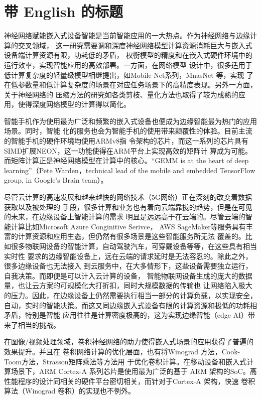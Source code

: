 
\chapter{带 English 的标题}
\label{cha:intro}

神经网络赋能嵌入式设备智能是当前智能应用的一大热点。作为神经网络与边缘计算的交叉领域，
这一研究需要调和深度神经网络模型计算资源消耗巨大与嵌入式设备端计算资源有限，功耗低的矛盾，
权衡模型的精度和在嵌入式硬件环境中的运行效率，实现智能应用的高效部署。一方面，在网络模型
设计中，很多适用于低计算复杂度的轻量级模型相继提出，如Mobile Net系列，MnasNet 等，实现
了在低参数量和低计算复杂度的场景在对应任务场景下的高精度表现。另外一方面，关于神经网络的
压缩方法的研究如各类剪枝、量化方法也取得了较为成熟的应用，使得深度网络模型的计算得以简化。


智能手机作为使用最为广泛和频繁的嵌入式设备也便成为边缘智能最为热门的应用场景。同时，智能
化的服务也会为智能手机的使用带来颠覆性的体验。目前主流的智能手机的硬件环境均使用ARMv8指
令架构的芯片，而这一系列的芯片具有SIMD扩展NEON，这一功能使得在ARM平台上实现高效的矩阵计
算成为可能。而矩阵计算正是神经网络模型在计算中的核心。“GEMM is at the heart of deep
 learning”（Pete Warden，technical lead of the mobile and embedded TensorFlow 
 group, in Google's Brain team）。

尽管云计算的高速发展和越来越快的网络技术（5G网络）正在深刻的改变着数据获取以及被处理的
手段，很多计算和业务也有着向云端靠拢的趋势，但是在可见的未来，在边缘设备上智能计算的需求
明显是远远高于在云端的。尽管云端的智能计算比如Microsoft Azure Conginitive Serivce，
AWS SageMaker等服务具有丰富的计算资源和应用生态，但仍然有很多场景是这些智能服务所无法
覆盖的。比如很多物联网设备的智能计算，自动驾驶汽车，可穿戴设备等等，在这些具有相当实时性
要求的边缘智能设备上，远在云端的请求延时是无法容忍的。除此之外，很多边缘设备也无法接入
到云服务中，在大多情形下，这些设备需要独立运行，自我决策。而即便是可以计入云计算的设备，
智能物联网设备生成的庞大的数据量，也让云方案的可规模化大打折扣，同时大规模数据的传输也
让网络陷入极大的压力。因此，在边缘设备上仍然需要执行相当一部分的计算负载，以实现安全，
自动，实时的智能决策。而这又同边缘嵌入式设备有限的计算资源和极低的功耗相矛盾，特别是智能
应用往往是计算密度极高的，这为实现边缘智能（edge AI）带来了相当的挑战。

在图像/视频处理领域，卷积神经网络的助力使得嵌入式场景的应用获得了普遍的效果提升。并且在
卷积网络计算的优化层面，也有将Winograd 方法，Cook-Toom方法，Strasson矩阵乘法等方法用
于优化卷积计算。在移动设备和嵌入式计算场景下，ARM Cortex-A 系列芯片是使用最为广泛的基于
ARM  架构的SoC。高性能程序的设计同相关的硬件平台密切相关，而针对于Cortex-A 架构，快速
卷积算法（Winograd 卷积）的实现也不例外。

